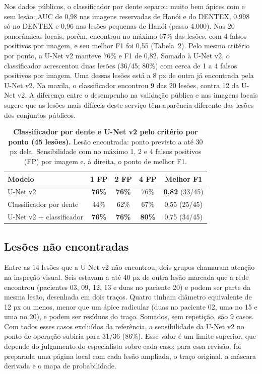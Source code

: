 \documentclass[twocolumn]{article}
\begin{document}
Nos dados públicos, o classificador por dente separou muito bem ápices com e sem lesão: AUC de 0,98 nas imagens reservadas de Hanói e do DENTEX, 0,998 só no DENTEX e 0,96 nas lesões pequenas de Hanói (passo 4.000). Nas 20 panorâmicas locais, porém, encontrou no máximo 67\% das lesões, com 4 falsos positivos por imagem, e seu melhor F1 foi 0,55 (Tabela~2). Pelo mesmo critério por ponto, a U-Net v2 manteve 76\% e F1 de 0,82. Somado à U-Net v2, o classificador acrescentou duas lesões (36/45; 80\%) com cerca de 1 a 4 falsos positivos por imagem. Uma dessas lesões está a 8 px de outra já encontrada pela U-Net v2. Na maxila, o classificador encontrou 9 das 20 lesões, contra 12 da U-Net v2. A diferença entre o desempenho na validação pública e nas imagens locais sugere que as lesões mais difíceis deste serviço têm aparência diferente das lesões dos conjuntos públicos.

\begin{table}[!t]
\caption{\textbf{Classificador por dente e U-Net v2 pelo critério por ponto (45 lesões).} Lesão encontrada: ponto previsto a até 30 px dela. Sensibilidade com no máximo 1, 2 e 4 falsos positivos (FP) por imagem e, à direita, o ponto de melhor F1.}
\centering\tablefont
\begin{tabularx}{\columnwidth}{L c c c c}
\toprule
Modelo & 1 FP & 2 FP & 4 FP & Melhor F1 \\
\midrule
U-Net v2 & \textbf{76\%} & \textbf{76\%} & 76\% & \textbf{0,82} (33/45) \\
Classificador por dente & 44\% & 62\% & 67\% & 0,55 (25/45) \\
U-Net v2 + classificador & \textbf{76\%} & \textbf{76\%} & \textbf{80\%} & 0,75 (34/45) \\
\bottomrule
\end{tabularx}
\end{table}

\subsection{Lesões não encontradas}

Entre as 14 lesões que a U-Net v2 não encontrou, dois grupos chamaram atenção na inspeção visual. Seis estavam a até 40 px de outra lesão marcada que a rede encontrou (pacientes 03, 09, 12, 13 e duas no paciente 20) e podem ser parte da mesma lesão, desenhada em dois traços. Quatro tinham diâmetro equivalente de 12 px ou menos, menor que um ápice radicular (duas no paciente 02, uma no 15 e uma no 20), e podem ser resíduos do traço. Somados, sem repetição, são 9 casos. Com todos esses casos excluídos da referência, a sensibilidade da U-Net v2 no ponto de operação subiria para 31/36 (86\%). Esse valor é um limite superior, que depende do julgamento do especialista sobre cada caso; para essa revisão, foi preparada uma página local com cada lesão ampliada, o traço original, a máscara derivada e o mapa de probabilidade.
\end{document}
